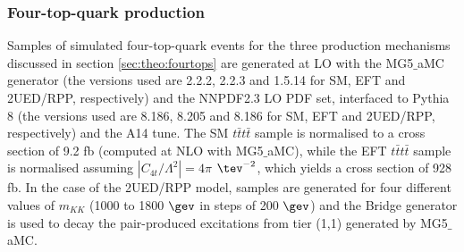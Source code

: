 \subsubsection{Four-top-quark production}
Samples of simulated four-top-quark events for the three production mechanisms discussed in section \ref{sec:theo:fourtops} are generated at LO with the {\sc MG5$\_$aMC} generator (the versions used are 2.2.2, 2.2.3 and 1.5.14 for SM, EFT and 2UED/RPP, respectively) and the NNPDF2.3 LO PDF set, interfaced to {\sc Pythia} 8 (the versions used are 8.186, 8.205 and 8.186 for SM, EFT and 2UED/RPP, respectively) and the A14 tune. The SM $t\bar{t}t\bar{t}$ sample is normalised to a cross section of 9.2 fb (computed at NLO with {\sc MG5$\_$aMC}), while the EFT $t\bar{t}t\bar{t}$ sample is normalised assuming $|C_{4t}/\Lambda^{2}|=4\pi$ $\tev^{-2}$, which yields a cross section of 928 fb. In the case of the 2UED/RPP model, samples are generated for four different values of $m_{KK}$ (1000 to 1800 $\gev$ in steps of 200 $\gev$) and the {\sc Bridge} \cite{Meade:2007js} generator is used to decay the pair-produced excitations from tier (1,1) generated by {\sc MG5$\_$aMC}.

